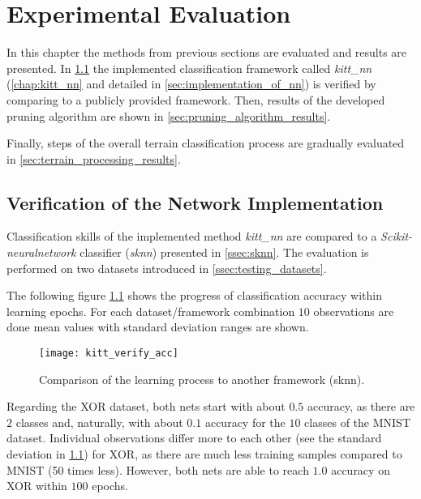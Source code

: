 \chapter{Experimental Evaluation} \label{chap:results}
In this chapter the methods from previous sections are evaluated and results are presented. In \cref{sec:verification_of_nn} the implemented classification framework called \textit{kitt\_nn} (\cref{chap:kitt_nn} and detailed in \cref{sec:implementation_of_nn}) is verified by comparing to a publicly provided framework. Then, results of the developed pruning algorithm are shown in \cref{sec:pruning_algorithm_results}.

Finally, steps of the overall terrain classification process are gradually evaluated in \cref{sec:terrain_processing_results}.

\section{Verification of the Network Implementation} \label{sec:verification_of_nn}
Classification skills of the implemented method \textit{kitt\_nn} are compared to a \textit{Scikit-neuralnetwork} classifier (\textit{sknn}) presented in \cref{ssec:sknn}. The evaluation is performed on two datasets introduced in \cref{ssec:testing_datasets}.

The following figure \ref{fig:kitt_verify_acc} shows the progress of classification accuracy within learning epochs. For each dataset/framework combination $ 10 $ observations are done mean values with standard deviation ranges are shown.

\begin{figure}[H]
  \centering
  \texttt{[image: kitt\_verify\_acc]}
  \caption{Comparison of the learning process to another framework (sknn).}
  \label{fig:kitt_verify_acc}
\end{figure}

Regarding the XOR dataset, both nets start with about $ 0.5 $ accuracy, as there are $ 2 $ classes and, naturally, with about $ 0.1 $ accuracy for the $ 10 $ classes of the MNIST dataset. Individual observations differ more to each other (see the standard deviation in \cref{fig:kitt_verify_acc}) for XOR, as there are much less training samples compared to MNIST (50 times less). However, both nets are able to reach $ 1.0 $ accuracy on XOR within $ 100 $ epochs.


